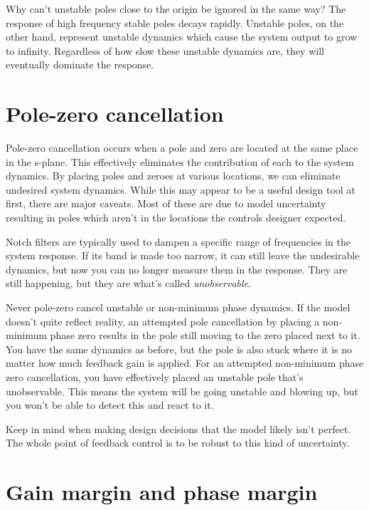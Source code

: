 Why can't unstable poles close to the origin be ignored in the same way? The
response of high frequency stable poles decays rapidly. Unstable poles, on the
other hand, represent unstable dynamics which cause the system output to grow to
infinity. Regardless of how slow these unstable dynamics are, they will
eventually dominate the response.

\section{Pole-zero cancellation}

Pole-zero cancellation occurs when a pole and zero are located at the same place
in the s-plane. This effectively eliminates the contribution of each to the
system dynamics. By placing poles and zeroes at various locations, we can
eliminate undesired system dynamics. While this may appear to be a useful design
tool at first, there are major caveats. Most of these are due to model
uncertainty resulting in poles which aren't in the locations the controls
designer expected.

Notch filters are typically used to dampen a specific range of frequencies in
the system response. If its band is made too narrow, it can still leave the
undesirable dynamics, but now you can no longer measure them in the response.
They are still happening, but they are what's called \textit{unobservable}.

Never pole-zero cancel unstable or non-minimum phase dynamics. If the model
doesn't quite reflect reality, an attempted pole cancellation by placing a
non-minimum phase zero results in the pole still moving to the zero placed next
to it. You have the same dynamics as before, but the pole is also stuck where it
is no matter how much feedback gain is applied. For an attempted non-minimum
phase zero cancellation, you have effectively placed an unstable pole that's
unobservable. This means the system will be going unstable and blowing up, but
you won't be able to detect this and react to it.

Keep in mind when making design decisions that the model likely isn't perfect.
The whole point of feedback control is to be robust to this kind of uncertainty.

\section{Gain margin and phase margin} \label{sec:gain-phase-margin}

